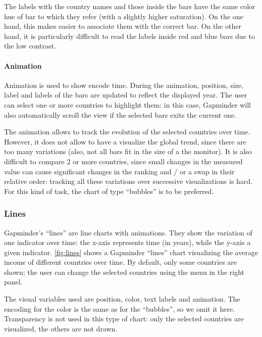 The labels with the country names and those inside the bars have the same color hue of bar to which they refer (with a slightly higher saturation).
On the one hand, this makes easier to associate them with the correct bar.
On the other hand, it is particularly difficult to read the labels inside red and blue bars due to the low contrast.

\paragraph{Animation}
Animation is used to show encode time.
During the animation, position, size, label and labels of the bars are updated to reflect the displayed year.
The user can select one or more countries to highlight them:
in this case, Gapminder will also automatically scroll the view if the selected bars exits the current one.

The animation allows to track the evolution of the selected countries over time.
However, it does not allow to have a visualize the global trend, since there are too many variations (also, not all bars fit in the size of a the monitor).
It is also difficult to compare $2$ or more countries, since small changes in the measured value can cause significant changes in the ranking and / or a swap in their relative order: tracking all these variations over successive visualizations is hard.
For this kind of task, the chart of type ``bubbles'' is to be preferred.


\subsubsection{Lines}
Gapminder's ``lines'' are line charts with animations.
They show the variation of one indicator over time:
the x-axis represents time (in years), while the y-axis a given indicator.
\cref{fig:lines} shows a Gapminder ``lines'' chart visualizing the average income of different countries over time.
By default, only some countries are shown;
the user can change the selected countries using the menu in the right panel.

The visual variables used are position, color, text labels and animation.
The encoding for the color is the same as for the ``bubbles'', so we omit it here.
Transparency is not used in this type of chart:
only the selected countries are visualized, the others are not drawn.

